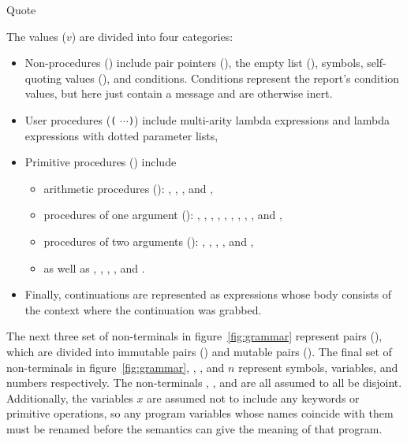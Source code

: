 \beginfig
\begin{center}



\end{center}
\caption{Quote}\label{fig:quote}
\endfig

The values ($v$) are divided into four categories:
%
\begin{itemize}
\item Non-procedures () include pair pointers
  (), the empty list (), symbols, self-quoting values
  (), and conditions. Conditions represent
  the report's condition values, but here just contain a message and
  are otherwise inert.
\item User procedures (\texttt{(}    $\cdots$\texttt{)}) include multi-arity lambda expressions and lambda expressions with dotted parameter lists,
\item Primitive procedures () include

\begin{itemize}
\item
 arithmetic procedures
  (): \va{+}, \va{-}, \va{/}, and \va{*}, 
\item 
  procedures of one
  argument (): , , , ,
  , , , , , and , 
  \item
  procedures of
  two arguments (): , , , ,
  and , 
  \item as well as , ,
  , , and .
\end{itemize}
\item Finally, continuations are represented as  expressions
  whose body consists of the context where the continuation was
  grabbed.
\end{itemize}
%
The next three set of non-terminals in figure~\ref{fig:grammar} represent pairs (), which are divided into immutable pairs () and mutable pairs (). The final set of non-terminals in figure~\ref{fig:grammar}, ,
, and $n$ represent symbols, variables, and
numbers respectively. The non-terminals , , and  are all assumed to all be disjoint. Additionally, the variables $x$ are assumed not to include any keywords or primitive operations, so any program variables whose names coincide with them must be renamed before the semantics can give the meaning of that program.

